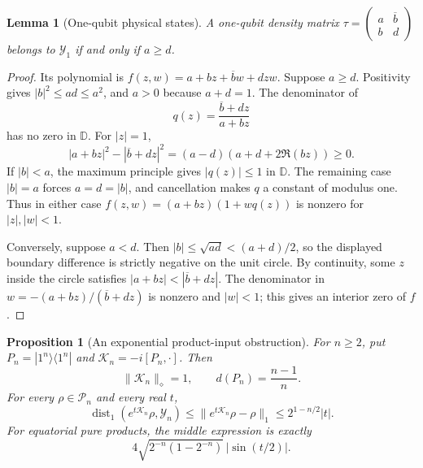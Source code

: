 \documentclass[reqno]{amsart}
\newtheorem{proposition}[theorem]{Proposition}
\newtheorem{lemma}[theorem]{Lemma}
\theoremstyle{definition}
\theoremstyle{remark}
\newcommand{\D}{\mathbb D}
\begin{document}
\begin{lemma}[One-qubit physical states]
\label{rob:onequbit}
A one-qubit density matrix
$\tau=\left(\begin{smallmatrix}a&\overline b\\ b&d\end{smallmatrix}\right)$
belongs to $\mathcal Y_1$ if and only if $a\geq d$.
\end{lemma}

\begin{proof}
Its polynomial is
$f(z,w)=a+bz+\overline b w+dzw$.
Suppose $a\geq d$.  Positivity gives $|b|^2\leq ad\leq a^2$,
and $a>0$ because $a+d=1$.  The denominator of
\[
 q(z)=\frac{\overline b+dz}{a+bz}
\]
has no zero in $\D$.  For $|z|=1$,
\[
 |a+bz|^2-|\overline b+dz|^2
 =(a-d)(a+d+2\Re(bz))\geq0.
\]
If $|b|<a$, the maximum principle gives $|q(z)|\leq1$ in $\D$.
The remaining case $|b|=a$ forces $a=d=|b|$, and cancellation makes
$q$ a constant of modulus one.  Thus in either case
$f(z,w)=(a+bz)(1+wq(z))$ is nonzero for $|z|,|w|<1$.

Conversely, suppose $a<d$.  Then
$|b|\leq\sqrt{ad}<(a+d)/2$, so the displayed boundary difference is
strictly negative on the unit circle.  By continuity, some $z$ inside
the circle satisfies
$|a+bz|<|\overline b+dz|$.
The denominator in
$w=-(a+bz)/(\overline b+dz)$ is nonzero and $|w|<1$;
this gives an interior zero of $f$.
\end{proof}

\begin{proposition}[An exponential product-input obstruction]
\label{rob:rankone}
For $n\geq2$, put $P_n=|1^n\rangle\langle1^n|$ and
$\mathcal K_n=-i[P_n,\cdot]$.  Then
\begin{equation}
 \|\mathcal K_n\|_\diamond=1,\qquad
 d(P_n)=\frac{n-1}{n}.
 \label{rob:rankone-distance}
\end{equation}
For every $\rho\in\mathcal P_n$ and every real $t$,
\begin{equation}
 \operatorname{dist}_1(e^{t\mathcal K_n}\rho,\mathcal Y_n)
 \leq\|e^{t\mathcal K_n}\rho-\rho\|_1
 \leq2^{1-n/2}|t|.
 \label{rob:rankone-bound}
\end{equation}
For equatorial pure products, the middle expression is exactly
\[
 4\sqrt{2^{-n}(1-2^{-n})}\,|\sin(t/2)|.
\]
\end{proposition}
\end{document}
